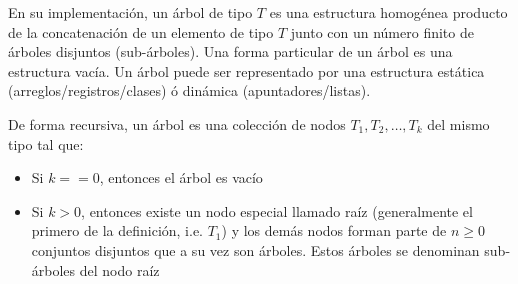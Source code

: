 En su implementación, un árbol de tipo $T$ es una estructura homogénea producto de la concatenación de un elemento de tipo $T$ junto con un número finito de árboles disjuntos (sub-árboles). Una forma particular de un árbol es una estructura vacía. Un árbol puede ser representado por una estructura estática (arreglos/registros/clases) ó dinámica (apuntadores/listas).

De forma recursiva, un árbol es una colección de nodos ${T_1, T_2,\dots, T_k}$ del mismo tipo tal que:
\begin{itemize}
\item Si $k == 0$, entonces el árbol es vacío
\item Si $k > 0$, entonces existe un nodo especial llamado raíz (generalmente el primero de la definición, i.e. $T_1$) y los demás nodos forman parte de $n \ge 0$ conjuntos disjuntos que a su vez son árboles. Estos árboles se denominan sub-árboles del nodo raíz
\end{itemize}

